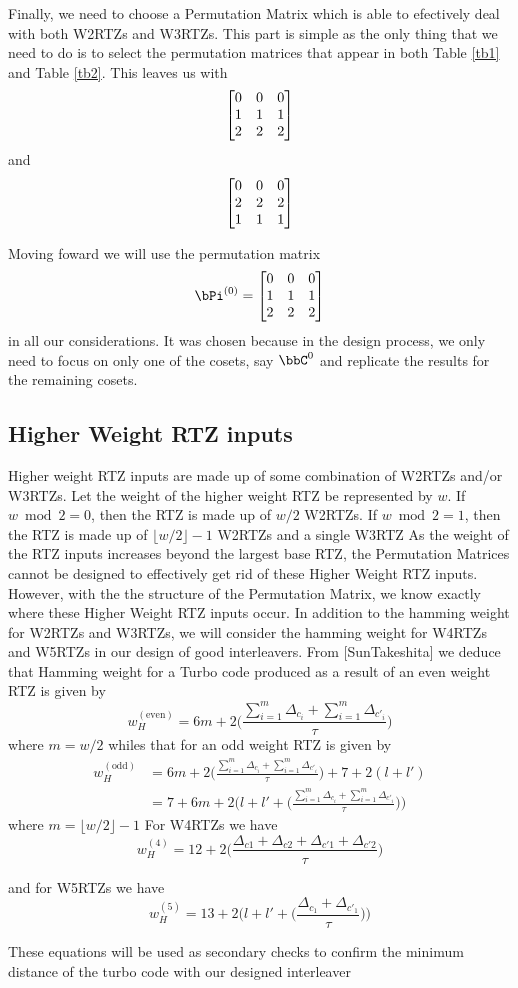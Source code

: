 Finally, we need to choose a Permutation Matrix which is able to efectively deal with both 
W2RTZs and W3RTZs. This part is simple as the only thing that we need to do is to select the permutation matrices that appear in both Table \ref{tb1} and Table \ref{tb2}. This leaves us with $$\begin{bmatrix} 0 & 0 & 0 \cr 1 & 1 & 1 \cr 2 & 2 & 2\end{bmatrix}$$  and  $$\begin{bmatrix} 0 & 0 & 0 \cr 2 & 2 & 2 \cr 1 & 1 & 1\end{bmatrix}$$

Moving foward we will use the permutation matrix $$\bPi^{(0)}=\begin{bmatrix} 0 & 0 & 0 \cr 1 & 1 & 1 \cr 2 & 2 & 2\end{bmatrix}$$ in all our considerations. It was chosen because in the design process, we only need to focus on only one of the cosets, say $\bbC^0$ and replicate the results for the remaining cosets.

\subsection{Higher Weight RTZ inputs}
Higher weight RTZ inputs are made up of some combination of W2RTZs and/or W3RTZs.
Let the weight of the higher weight RTZ be represented by $w$. If $w \bmod 2 =0$, then the RTZ is made up of $w/2$ W2RTZs. If $w \bmod 2 =1$, then the RTZ is made up of $\lfloor w/2 \rfloor -1 $ W2RTZs and a single W3RTZ
As the weight of the RTZ inputs increases beyond the largest base RTZ, the Permutation Matrices cannot be designed to effectively get rid of these Higher Weight RTZ inputs. However, with the the structure of the Permutation Matrix, we know exactly where these Higher Weight RTZ inputs occur.
In addition to the hamming weight for W2RTZs and W3RTZs, we will consider the hamming weight for W4RTZs and W5RTZs in our design of good interleavers. From [SunTakeshita] we deduce that Hamming weight for a Turbo code produced as a result of an even weight RTZ is given by
\begin{equation}
w_H^{(\text{even})}=6m+2\Big(\frac{\sum_{i=1}^{m}\Delta_{c_i}+\sum_{i=1}^{m}\Delta_{c'_i}}{\tau}\Big)
\end{equation}
where $m=w/2$
whiles that for an odd weight RTZ is given by 
\begin{equation}
\begin{split}
w_H^{(\text{odd})}&=6m+2\Big(\frac{\sum_{i=1}^{m}\Delta_{c_i}+\sum_{i=1}^{m}\Delta_{c'_i}}{\tau}\Big)+7+2(l+l')\\
&=7+6m+2\Bigg(l+l'+\Big(\frac{\sum_{i=1}^{m}\Delta_{c_i}+\sum_{i=1}^{m}\Delta_{c'_i}}{\tau}\Big)\Bigg)
\end{split}
\end{equation}
where $m=\lfloor w/2 \rfloor-1$
For W4RTZs we have
\begin{equation}
w_H^{(4)}=12+2\Big(\frac{\Delta_{c1}+\Delta_{c2}+\Delta_{c'1}+\Delta_{c'2}}{\tau}\Big)
\end{equation}

and for W5RTZs we have 
\begin{equation}
w_H^{(5)}=13+2\Bigg(l+l'+\Big(\frac{\Delta_{c_1}+\Delta_{c'_1}}{\tau}\Big)\Bigg)
\end{equation}

These equations will be used as secondary checks to confirm the minimum distance of the turbo code with our designed interleaver